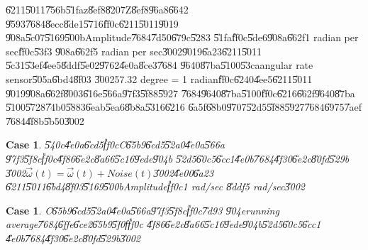 \documentclass[12pt,a4paper]{article}
\newtheorem{case}[theorem]{Case}
\begin{document}
\bigskip

\U{6211}\U{5011}\U{756b}\U{51fa}z\U{8ef8}\U{8207}Z\U{8ef8}\U{96a8}\U{6642}%
\U{9593}\U{7684}\U{8ecc}\U{8de1}\U{5716}\U{ff0c}\U{6211}\U{5011}\U{9019}%
\U{908a}\U{5c07}\U{5169}\U{500b}Amplitude\U{7684}\U{7d50}\U{679c}\U{5283}%
\U{51fa}\U{ff0c}\U{5de6}\U{908a}\U{662f}1 radian per sec\U{ff0c}\U{53f3}%
\U{908a}\U{662f}5 radian per sec\U{3002}\U{9019}\U{6a23}\U{6211}\U{5011}%
\U{5c31}\U{53ef}\U{4ee5}\U{8ddf}\U{5e02}\U{9762}\U{4e0a}\U{8ce3}\U{7684}%
\U{9640}\U{87ba}\U{5100}\U{53ca}angular rate sensor\U{505a}\U{6bd4}\U{8f03}%
\U{3002}57.32 degree = 1 radian\U{ff0c}\U{6240}\U{4ee5}\U{6211}\U{5011}%
\U{9019}\U{908a}\U{662f}\U{8003}\U{616e}\U{566a}\U{97f3}\U{5f88}\U{5927}%
\U{7684}\U{9640}\U{87ba}\U{5100}\U{ff0c}\U{6216}\U{662f}\U{9640}\U{87ba}%
\U{5100}\U{5728}\U{74b0}\U{5883}\U{6eab}\U{5ea6}\U{8b8a}\U{5316}\U{6216}%
\U{6a5f}\U{68b0}\U{9707}\U{52d5}\U{5f88}\U{5927}\U{7684}\U{6975}\U{7aef}%
\U{7684}\U{4f8b}\U{5b50}\U{3002}

%
\begin{center}

\end{center}%

\bigskip

\begin{case}
\U{540c}\U{4e0a}\U{6cd5}\U{ff0c}C\U{65b9}\U{6cd5}\U{52a0}\U{4e0a}\U{566a}%
\U{97f3}\U{5f8c}\U{ff0c}\U{4f86}\U{6e2c}\U{8a66}\U{5c16}\U{9ede}\U{904b}%
\U{52d5}\U{60c5}\U{6cc1}\U{4e0b}\U{7684}\U{4f30}\U{6e2c}\U{80fd}\U{529b}%
\U{3002}$\vec{\omega}(t)=\vec{\omega}(t)+Noise(t)$\U{3002}\U{4e00}\U{6a23}%
\U{6211}\U{5011}\U{6bd4}\U{8f03}\U{5169}\U{500b}Amplitude\U{ff0c}1 rad/sec%
\U{8ddf}5 rad/sec\U{3002}
\end{case}

%
\begin{center}

\end{center}%

\begin{case}
C\U{65b9}\U{6cd5}\U{52a0}\U{4e0a}\U{566a}\U{97f3}\U{5f8c}\U{ff0c}\U{7d93}%
\U{904e}running average\U{7684}\U{6ffe}\U{6ce2}\U{65b9}\U{5f0f}\U{ff0c}%
\U{4f86}\U{6e2c}\U{8a66}\U{5c16}\U{9ede}\U{904b}\U{52d5}\U{60c5}\U{6cc1}%
\U{4e0b}\U{7684}\U{4f30}\U{6e2c}\U{80fd}\U{529b}\U{3002}
\end{case}
\end{document}
